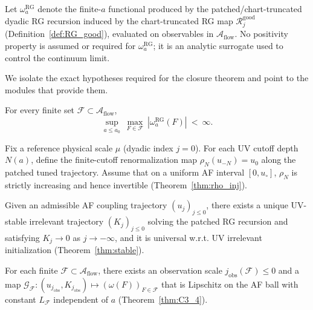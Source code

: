 Let $\omega_a^{\mathrm{RG}}$ denote the finite-$a$ functional produced by the patched/chart-truncated dyadic RG recursion induced by the chart-truncated RG map $\mathcal R_j^{\mathrm{good}}$ (Definition~\ref{def:RG_good}), evaluated on observables in $\mathcal A_{\mathrm{flow}}$.
No positivity property is assumed or required for $\omega_a^{\mathrm{RG}}$; it is an analytic surrogate used to control the continuum limit.

We isolate the exact hypotheses required for the closure theorem and point to the modules that provide them.

\begin{proposition}\label{ass:precompact}
For every finite set $\mathcal F\subset\mathcal A_{\mathrm{flow}}$,
\[
\sup_{a\le a_0}\ \max_{F\in\mathcal F}\ |\omega^{\mathrm{RG}}_a(F)|\ <\ \infty.
\]
\end{proposition}

\begin{proposition}\label{ass:inj}
Fix a reference physical scale $\mu$ (dyadic index $j=0$). For each UV cutoff depth $N(a)$, define the finite-cutoff renormalization map
$\rho_N(u_{-N})=u_0$ along the patched tuned trajectory.
Assume that on a uniform AF interval $[0,u_\circ]$, $\rho_N$ is strictly increasing and hence invertible (Theorem~\ref{thm:rho_inj}).
\end{proposition}

\begin{proposition}\label{ass:stable}
Given an admissible AF coupling trajectory $(u_j)_{j\le 0}$, there exists a unique UV-stable irrelevant trajectory $(K_j)_{j\le 0}$
solving the patched RG recursion and satisfying $K_j\to 0$ as $j\to -\infty$, and it is universal w.r.t. UV irrelevant initialization (Theorem~\ref{thm:stable}).
\end{proposition}

\begin{proposition}\label{ass:Lip}
For each finite $\mathcal F\subset\mathcal A_{\mathrm{flow}}$, there exists an observation scale $j_{\mathrm{obs}}(\mathcal F)\le 0$ and a map
$\mathcal G_{\mathcal F}:(u_{j_{\mathrm{obs}}},K_{j_{\mathrm{obs}}})\mapsto (\omega(F))_{F\in\mathcal F}$
that is Lipschitz on the AF ball with constant $L_{\mathcal F}$ independent of $a$ (Theorem~\ref{thm:C3_4}).
\end{proposition}

